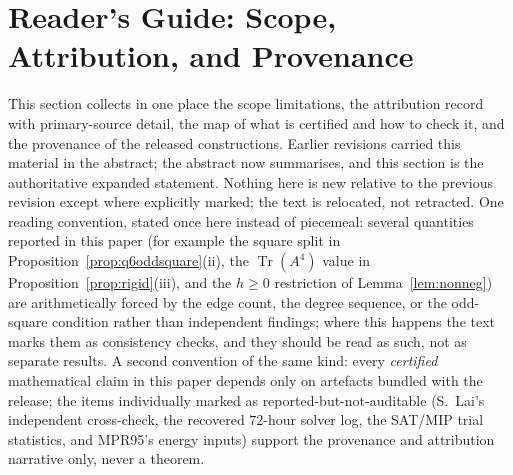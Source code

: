 \documentclass[12pt,a4paper]{article}
\theoremstyle{definition}
\begin{document}
\section{Reader's Guide: Scope, Attribution, and Provenance}\label{sec:guide}

This section collects in one place the scope limitations, the
attribution record with primary-source detail, the map of what is
certified and how to check it, and the provenance of the released
constructions. Earlier revisions carried this material in the
abstract; the abstract now summarises, and this section is the
authoritative expanded statement. Nothing here is new relative to
the previous revision except where explicitly marked; the text is
relocated, not retracted. One reading convention, stated once here
instead of piecemeal: several quantities reported in this paper (for
example the square split in Proposition~\ref{prop:q6oddsquare}(ii), the
$\operatorname{Tr}(A^4)$ value in Proposition~\ref{prop:rigid}(iii), and
the $h\ge0$ restriction of Lemma~\ref{lem:nonneg}) are arithmetically
forced by the edge count, the degree sequence, or the odd-square
condition rather than independent findings; where this happens the text
marks them as consistency checks, and they should be read as such, not as
separate results. A second convention of the same kind: every
\emph{certified} mathematical claim in this paper depends only on
artefacts bundled with the release; the items individually marked as
reported-but-not-auditable (S.~Lai's independent cross-check, the
recovered $72$-hour solver log, the SAT/MIP trial statistics, and MPR95's
energy inputs) support the provenance and attribution narrative only,
never a theorem.
\end{document}
